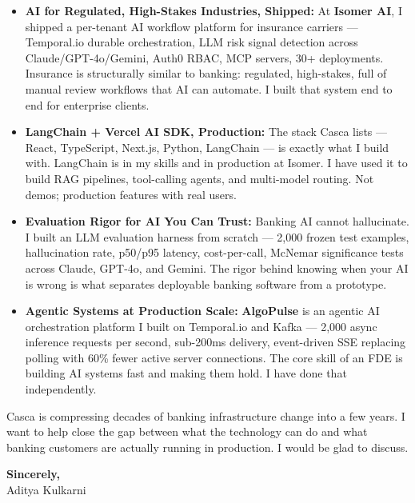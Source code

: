 \documentclass[11pt,letterpaper]{article}
\begin{document}
\begin{itemize}[leftmargin=*, itemsep=3pt, label={\color{CascaNavy}\faAngleRight}]
    \item \textbf{AI for Regulated, High-Stakes Industries, Shipped:} At \textbf{Isomer AI}, I shipped a per-tenant AI workflow platform for insurance carriers --- Temporal.io durable orchestration, LLM risk signal detection across Claude/GPT-4o/Gemini, Auth0 RBAC, MCP servers, 30+ deployments. Insurance is structurally similar to banking: regulated, high-stakes, full of manual review workflows that AI can automate. I built that system end to end for enterprise clients.

    \item \textbf{LangChain + Vercel AI SDK, Production:} The stack Casca lists --- React, TypeScript, Next.js, Python, LangChain --- is exactly what I build with. LangChain is in my skills and in production at Isomer. I have used it to build RAG pipelines, tool-calling agents, and multi-model routing. Not demos; production features with real users.

    \item \textbf{Evaluation Rigor for AI You Can Trust:} Banking AI cannot hallucinate. I built an LLM evaluation harness from scratch --- 2,000 frozen test examples, hallucination rate, p50/p95 latency, cost-per-call, McNemar significance tests across Claude, GPT-4o, and Gemini. The rigor behind knowing when your AI is wrong is what separates deployable banking software from a prototype.

    \item \textbf{Agentic Systems at Production Scale:} \textbf{AlgoPulse} is an agentic AI orchestration platform I built on Temporal.io and Kafka --- 2,000 async inference requests per second, sub-200ms delivery, event-driven SSE replacing polling with 60\% fewer active server connections. The core skill of an FDE is building AI systems fast and making them hold. I have done that independently.
\end{itemize}

\vspace{6pt}

Casca is compressing decades of banking infrastructure change into a few years. I want to help close the gap between what the technology can do and what banking customers are actually running in production. I would be glad to discuss.

\vspace{12pt}

\textbf{Sincerely,}\\[8pt]
Aditya Kulkarni
\end{document}
